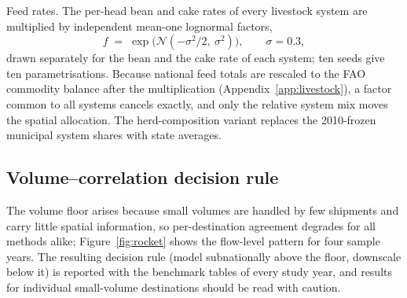 Feed rates. The per-head bean and cake rates of every livestock system
are multiplied by independent mean-one lognormal factors,
\begin{equation}\label{eq:feedjitter}
  f \;=\; \exp\!\big(\mathcal{N}(-\sigma^2/2,\ \sigma^2)\big),
  \qquad \sigma = 0.3 ,
\end{equation}
drawn separately for the bean and the cake rate of each system; ten
seeds give ten parametrisations. Because national feed totals are
rescaled to the FAO commodity balance after the multiplication
(Appendix~\ref{app:livestock}), a factor common to all systems cancels
exactly, and only the relative system mix moves the spatial
allocation. The herd-composition variant replaces the 2010-frozen
municipal system shares with state averages.

\subsection{Volume--correlation decision rule}\label{subsubsec:volcorr}
The volume floor arises because small volumes are handled by few
shipments and carry little spatial information, so per-destination
agreement degrades for all methods alike; Figure~\ref{fig:rocket} shows
the flow-level pattern for four sample years. The resulting decision rule
(model subnationally above the floor, downscale below it) is reported with
the benchmark tables of every study year, and results for individual
small-volume destinations should be read with caution.

